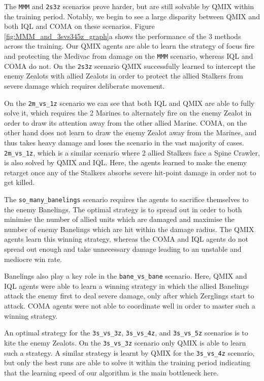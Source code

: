 The \texttt{MMM} and \texttt{2s3z} scenarios prove harder, but are still solvable by QMIX within the training period. Notably, we begin to see a large disparity between QMIX and both IQL and COMA on these scenarios. Figure \ref{fig:MMM_and_3svs345z_graph}a shows the performance of the 3 methods across the training. Our QMIX agents are able to learn the strategy of focus fire and protecting the Medivac from damage on the \texttt{MMM} scenario, whereas IQL and COMA do not. On the \texttt{2s3z} scenario QMIX successfully learned to intercept the enemy Zealots with allied Zealots in order to protect the allied Stalkers from severe damage which requires deliberate movement.

On the \texttt{2m\_vs\_1z} scenario we can see that both IQL and QMIX are able to fully solve it, which requires the 2 Marines to alternately fire on the enemy Zealot in order to draw its attention away from the other allied Marine. COMA, on the other hand does not learn to draw the enemy Zealot away from the Marines, and thus takes heavy damage and loses the scenario in the vast majority of cases. \texttt{2m\_vs\_1z}, which is a similar scenario where 2 allied Stalkers face a Spine Crawler, is also solved by QMIX and IQL. Here, the agents learned to make the enemy retarget once any of the Stalkers absorbs severe hit-point damage in order not to get killed.

The \texttt{so\_many\_banelings} scenario requires the agents to sacrifice themselves to the enemy Banelings. The optimal strategy is to spread out in order to both minimise the number of allied units which are damaged and maximise the number of enemy Banelings which are hit within the damage radius. %
The QMIX agents learn this winning strategy, whereas the COMA and IQL agents do not spread out enough and take unnecessary damage leading to an unstable and mediocre win rate.

Banelings also play a key role in the \texttt{bane\_vs\_bane} scenario. Here, QMIX and IQL agents were able to learn a winning strategy in which the allied Banelings attack the enemy first to deal severe damage, only after which Zerglings start to attack. COMA agents were not able to coordinate well in order to master such a winning strategy. 

An optimal strategy for the \texttt{3s\_vs\_3z}, \texttt{3s\_vs\_4z}, and \texttt{3s\_vs\_5z} scenarios is to kite the enemy Zealots. On the \texttt{3s\_vs\_3z} scenario only QMIX is able to learn such a strategy. A similar strategy is learnt by QMIX for the \texttt{3s\_vs\_4z} scenario, but only the best runs are able to solve it within the training period indicating that the learning speed of our algorithm is the main bottleneck here. 

